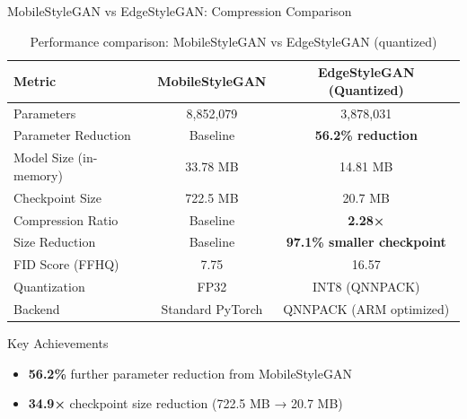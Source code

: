 \documentclass[aspectratio=169,xcolor=dvipsnames]{beamer}
\begin{document}
\begin{frame}{MobileStyleGAN vs EdgeStyleGAN: Compression Comparison}
    \begin{table}
        \centering
        \footnotesize
        \begin{tabular}{l c c}
            \toprule
            \textbf{Metric} & \textbf{MobileStyleGAN} & \textbf{EdgeStyleGAN (Quantized)} \\
            \midrule
            Parameters & 8,852,079 & 3,878,031 \\
            Parameter Reduction & Baseline & \textbf{56.2\% reduction} \\
            Model Size (in-memory) & 33.78 MB & 14.81 MB \\
            Checkpoint Size & 722.5 MB & 20.7 MB \\
            Compression Ratio & Baseline & \textbf{2.28×} \\
            Size Reduction & Baseline & \textbf{97.1\% smaller checkpoint} \\
            FID Score (FFHQ) & 7.75 & 16.57 \\
            Quantization & FP32 & INT8 (QNNPACK) \\
            Backend & Standard PyTorch & QNNPACK (ARM optimized) \\
            \bottomrule
        \end{tabular}
        \caption{Performance comparison: MobileStyleGAN vs EdgeStyleGAN (quantized)}
    \end{table}
    
    \vspace{0.3cm}
    
    \begin{block}{Key Achievements}
        \begin{itemize}
            \item \textbf{56.2\%} further parameter reduction from MobileStyleGAN
            \item \textbf{34.9×} checkpoint size reduction (722.5 MB → 20.7 MB)
        \end{itemize}
    \end{block}
\end{frame}
\end{document}
